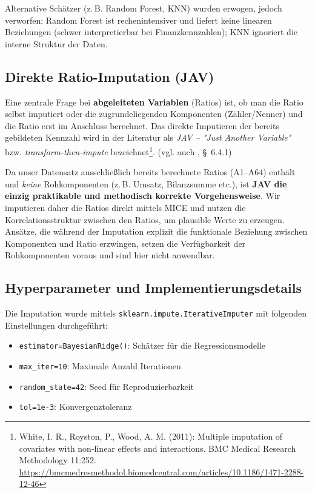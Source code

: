 Alternative Schätzer (z.\,B. Random Forest, KNN) wurden erwogen, jedoch verworfen: Random Forest ist rechenintensiver und liefert keine linearen Beziehungen (schwer interpretierbar bei Finanzkennzahlen); KNN ignoriert die interne Struktur der Daten.

\subsection{Direkte Ratio-Imputation (JAV)}

Eine zentrale Frage bei \textbf{abgeleiteten Variablen} (Ratios) ist, ob man die Ratio selbst imputiert oder die zugrundeliegenden Komponenten (Zähler/Nenner) und die Ratio erst im Anschluss berechnet. Das direkte Imputieren der bereits gebildeten Kennzahl wird in der Literatur als \emph{JAV – "Just Another Variable"} bzw. \emph{transform-then-impute} bezeichnet\footnote{White, I. R., Royston, P., Wood, A. M. (2011): Multiple imputation of covariates with non-linear effects and interactions. BMC Medical Research Methodology 11:252. \url{https://bmcmedresmethodol.biomedcentral.com/articles/10.1186/1471-2288-12-46}}. (vgl. auch \parencite{vanbuuren2018fimd}, \S~6.4.1)

Da unser Datensatz ausschließlich bereits berechnete Ratios (A1–A64) enthält und \textit{keine} Rohkomponenten (z.\,B. Umsatz, Bilanzsumme etc.), ist \textbf{JAV die einzig praktikable und methodisch korrekte Vorgehensweise}. Wir imputieren daher die Ratios direkt mittels MICE \parencite{vanbuuren2011mice} und nutzen die Korrelationsstruktur zwischen den Ratios, um plausible Werte zu erzeugen. Ansätze, die während der Imputation explizit die funktionale Beziehung zwischen Komponenten und Ratio erzwingen, setzen die Verfügbarkeit der Rohkomponenten voraus und sind hier nicht anwendbar.

\subsection{Hyperparameter und Implementierungsdetails}

Die Imputation wurde mittels \texttt{sklearn.impute.IterativeImputer} mit folgenden Einstellungen durchgeführt:

\begin{itemize}[topsep=0.2\baselineskip]
    \item \texttt{estimator=BayesianRidge()}: Schätzer für die Regressionsmodelle
    \item \texttt{max\_iter=10}: Maximale Anzahl Iterationen
    \item \texttt{random\_state=42}: Seed für Reproduzierbarkeit
    \item \texttt{tol=1e-3}: Konvergenztoleranz
\end{itemize}

